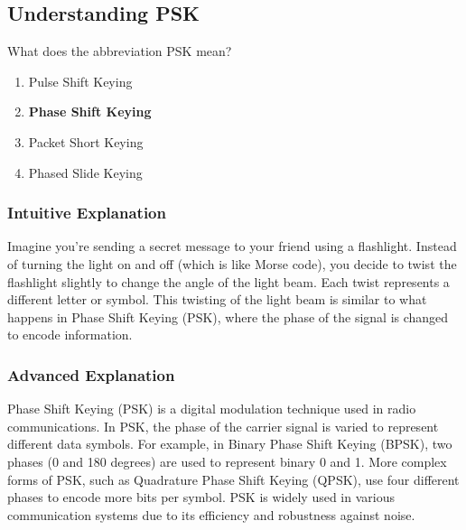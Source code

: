 \subsection{Understanding PSK}\label{T8D06}

\begin{tcolorbox}[colback=gray!10!white,colframe=black!75!black,title=T8D06]
What does the abbreviation PSK mean?
\begin{enumerate}[noitemsep]
    \item Pulse Shift Keying
    \item \textbf{Phase Shift Keying}
    \item Packet Short Keying
    \item Phased Slide Keying
\end{enumerate}
\end{tcolorbox}

\subsubsection*{Intuitive Explanation}
Imagine you're sending a secret message to your friend using a flashlight. Instead of turning the light on and off (which is like Morse code), you decide to twist the flashlight slightly to change the angle of the light beam. Each twist represents a different letter or symbol. This twisting of the light beam is similar to what happens in Phase Shift Keying (PSK), where the phase of the signal is changed to encode information.

\subsubsection*{Advanced Explanation}
Phase Shift Keying (PSK) is a digital modulation technique used in radio communications. In PSK, the phase of the carrier signal is varied to represent different data symbols. For example, in Binary Phase Shift Keying (BPSK), two phases (0 and 180 degrees) are used to represent binary 0 and 1. More complex forms of PSK, such as Quadrature Phase Shift Keying (QPSK), use four different phases to encode more bits per symbol. PSK is widely used in various communication systems due to its efficiency and robustness against noise.